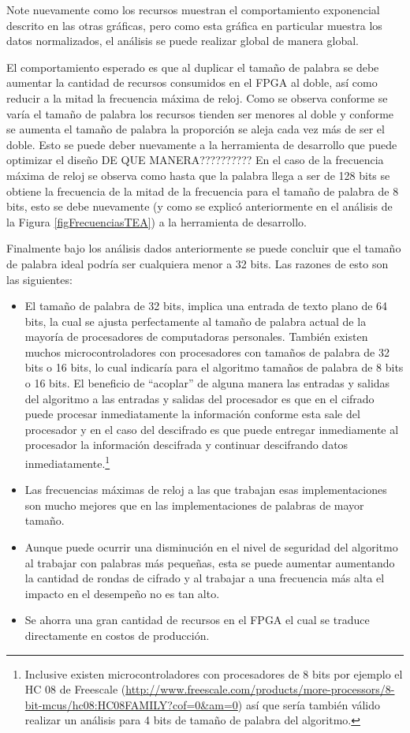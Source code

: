 	
Note nuevamente como los recursos muestran el comportamiento exponencial descrito en las otras gráficas, pero como esta gráfica en particular muestra los datos normalizados, el análisis se puede realizar global de manera global.

El comportamiento esperado es que al duplicar el tamaño de palabra se debe aumentar la cantidad de recursos consumidos en el FPGA al doble, así como reducir a la mitad la frecuencia máxima de reloj. Como se observa conforme se varía el tamaño de palabra los recursos tienden ser menores al doble y conforme se aumenta el tamaño de palabra la proporción se aleja cada vez más de ser el doble. Esto se puede deber nuevamente a la herramienta de desarrollo que puede optimizar el diseño DE QUE MANERA??????????
En el caso de la frecuencia máxima de reloj se observa como hasta que la palabra llega a ser de 128 bits se obtiene la frecuencia de la mitad de la frecuencia para el tamaño de palabra de 8 bits, esto se debe nuevamente (y como se explicó anteriormente en el análisis de la Figura \ref{figFrecuenciasTEA}) a la herramienta de desarrollo.


Finalmente bajo los análisis dados anteriormente se puede concluir que el tamaño de palabra ideal podría ser cualquiera menor a 32 bits. Las razones de esto son las siguientes:

\begin{itemize}
\item El tamaño de palabra de 32 bits, implica una entrada de texto plano de 64 bits, la cual se ajusta perfectamente al tamaño de palabra actual de la mayoría de procesadores de computadoras personales. También existen muchos microcontroladores con procesadores con tamaños de palabra de 32 bits o 16 bits, lo cual indicaría para el algoritmo tamaños de palabra de 8 bits o 16 bits. El beneficio de ``acoplar'' de alguna manera las entradas y salidas del algoritmo a las entradas y salidas del procesador es que en el cifrado puede procesar inmediatamente la información conforme esta sale del procesador y en el caso del descifrado es que puede entregar inmediamente al procesador la información descifrada y continuar descifrando datos inmediatamente.\footnote{Inclusive existen microcontroladores con procesadores de 8 bits por ejemplo el HC 08 de Freescale (\url{http://www.freescale.com/products/more-processors/8-bit-mcus/hc08:HC08FAMILY?cof=0&am=0}) así que sería también válido realizar un análisis para 4 bits de tamaño de palabra del algoritmo.}

\item Las frecuencias máximas de reloj a las que trabajan esas implementaciones son mucho mejores que en las implementaciones de palabras de mayor tamaño.

\item Aunque puede ocurrir una disminución en el nivel de seguridad del algoritmo al trabajar con palabras más pequeñas, esta se puede aumentar aumentando la cantidad de rondas de cifrado y al trabajar a una frecuencia más alta el impacto en el desempeño no es tan alto.

\item Se ahorra una gran cantidad de recursos en el FPGA el cual se traduce directamente en costos de producción.
\end{itemize}
